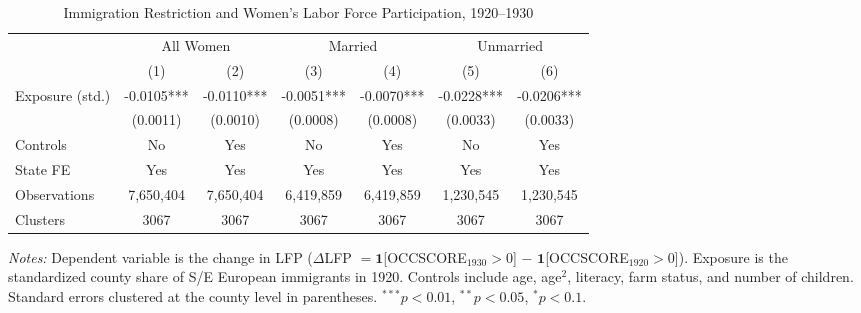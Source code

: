 \begin{table}[htbp]
\centering
\caption{Immigration Restriction and Women's Labor Force Participation, 1920--1930}
\label{tab:main}
\begin{adjustbox}{max width=\textwidth}
\begin{tabular}{lcccccc}
\hline\hline
 & \multicolumn{2}{c}{All Women} & \multicolumn{2}{c}{Married} & \multicolumn{2}{c}{Unmarried} \\
\cmidrule(lr){2-3} \cmidrule(lr){4-5} \cmidrule(lr){6-7}
 & (1) & (2) & (3) & (4) & (5) & (6) \\
\hline
Exposure (std.) & -0.0105*** & -0.0110*** & -0.0051*** & -0.0070*** & -0.0228*** & -0.0206*** \\
 & (0.0011) & (0.0010) & (0.0008) & (0.0008) & (0.0033) & (0.0033) \\
\hline
Controls & No & Yes & No & Yes & No & Yes \\
State FE & Yes & Yes & Yes & Yes & Yes & Yes \\
Observations & 7,650,404 & 7,650,404 & 6,419,859 & 6,419,859 & 1,230,545 & 1,230,545 \\
Clusters & 3067 & 3067 & 3067 & 3067 & 3067 & 3067 \\
\hline\hline
\end{tabular}
\end{adjustbox}
\begin{tablenotes}[flushleft]
\small
\item \textit{Notes:} Dependent variable is the change in LFP ($\Delta$LFP $= \mathbf{1}$[OCCSCORE$_{1930} > 0$] $-$ $\mathbf{1}$[OCCSCORE$_{1920} > 0$]). Exposure is the standardized county share of S/E European immigrants in 1920. Controls include age, age$^2$, literacy, farm status, and number of children. Standard errors clustered at the county level in parentheses. $^{***}p<0.01$, $^{**}p<0.05$, $^{*}p<0.1$.
\end{tablenotes}
\end{table}
